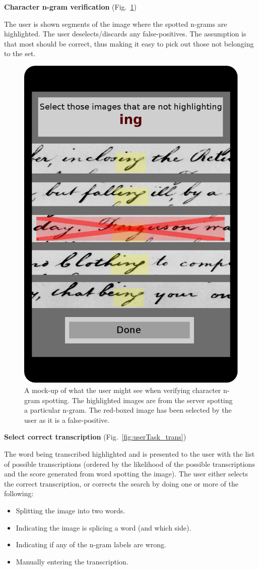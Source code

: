 \documentclass[ms]{byuprop}
\begin{document}
{\setlength{\parindent}{0cm}
\textbf{Character n-gram verification} (Fig.~\ref{fig:userTask_spot})

\begin{addmargin}[3em]{3em}
The user is shown segments of the image where the spotted n-grams are highlighted. The user deselects/discards any false-positives. The assumption is that most should be correct, thus making it easy to pick out those not belonging to the set.
\\[.5cm]
\end{addmargin}

\begin{figure}[h]
    \centering
    \includegraphics[width=.4\textwidth]{userTask_spot}
    \caption{A mock-up of what the user might see when verifying character n-gram spotting. The highlighted images are from the server spotting a particular n-gram. The red-boxed image has been selected by the user as it is a false-positive.}
    \label{fig:userTask_spot}
\end{figure}

\textbf{Select correct transcription} (Fig.~\ref{fig:userTask_trans})

\begin{addmargin}[3em]{3em}
The word being transcribed highlighted and is presented to the user with the list of possible transcriptions (ordered by the likelihood of the possible transcriptions and the score generated from word spotting the image). The user either selects the correct transcription, or corrects the search by doing one or more of the following:
\begin{itemize}
    \item Splitting the image into two words.
    \item Indicating the image is splicing a word (and which side).
    \item Indicating if any of the n-gram labels are wrong.
    \item Manually entering the transcription.
\end{itemize}

\end{addmargin}
}
\end{document}

